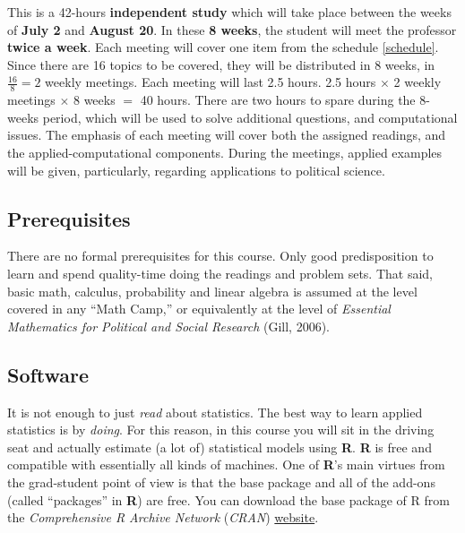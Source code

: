 \documentclass[letterpaper]{article}
\begin{document}
This is a 42-hours {\bf {\color{blue}independent study}} which will take place between the weeks of {\bf July 2} and {\bf August 20}. In these {\bf 8 weeks}, the student will meet the professor {\bf twice a week}. Each meeting will cover one item from the schedule \autoref{schedule}.  Since there are 16 topics to be covered, they will be distributed in 8 weeks, in $\frac{16}{8}=2$ weekly meetings. Each meeting will last 2.5 hours. 2.5 hours $\times$ 2 weekly meetings $\times$ 8 weeks $=$ 40 hours. There are two hours to spare during the 8-weeks period, which will be used to solve additional questions, and computational issues. The emphasis of each meeting will cover both the assigned readings, and the applied-computational components. During the meetings, applied examples will be given, particularly, regarding applications to political science. 



\subsection*{Prerequisites}


There are no formal prerequisites for this course. Only good predisposition to learn and spend quality-time doing the readings and problem sets. That said, basic math, calculus, probability and linear algebra is assumed at the level covered in any ``Math Camp,'' or equivalently at the level of \emph{Essential Mathematics for Political and Social Research} (Gill, 2006).


\subsection*{Software}

It is not enough to just \emph{read} about statistics. The best way to learn applied statistics is by \emph{doing}. For this reason, in this course you will sit in the driving seat and actually estimate (a lot of) statistical models using {\bf R}. {\bf R} is free and compatible with essentially all kinds of machines. One of {\bf R}'s main virtues from the grad-student point of view is that the base package and all of the add-ons (called ``packages'' in {\bf R}) are free. You can download the base package of R from the \emph{Comprehensive R Archive Network} (\emph{CRAN}) \href{http://www.cran.r-project.org}{website}.  
\end{document}
